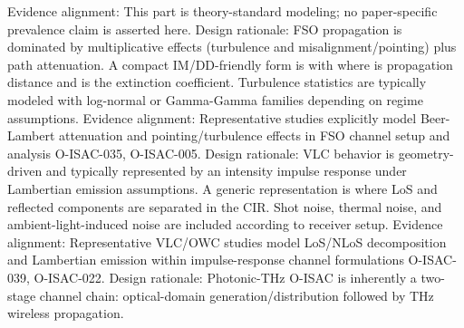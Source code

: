 {}Evidence alignment: This part is theory-standard modeling; no paper-specific prevalence claim is asserted here.\markdownRendererInterblockSeparator
{}
\markdownRendererSectionEnd \markdownRendererSectionBegin
{}\markdownRendererInterblockSeparator
{}Design rationale: FSO propagation is dominated by multiplicative effects (turbulence and misalignment/pointing) plus path attenuation.\markdownRendererParagraphSeparator
{}A compact IM/DD-friendly form is\markdownRendererSoftLineBreak
{}\markdownRendererSoftLineBreak
{}with\markdownRendererSoftLineBreak
{}\markdownRendererSoftLineBreak
{}where  is propagation distance and \markdownRendererInlineMath{\kappa} is the extinction coefficient. Turbulence statistics are typically modeled with log-normal or Gamma-Gamma families depending on regime assumptions.\markdownRendererParagraphSeparator
{}Evidence alignment: Representative studies explicitly model Beer-Lambert attenuation and pointing/turbulence effects in FSO channel setup and analysis O-ISAC-035, O-ISAC-005.\markdownRendererInterblockSeparator
{}
\markdownRendererSectionEnd \markdownRendererSectionBegin
{}\markdownRendererInterblockSeparator
{}Design rationale: VLC behavior is geometry-driven and typically represented by an intensity impulse response under Lambertian emission assumptions.\markdownRendererParagraphSeparator
{}A generic representation is\markdownRendererSoftLineBreak
{}\markdownRendererSoftLineBreak
{}where LoS and reflected components are separated in the CIR. Shot noise, thermal noise, and ambient-light-induced noise are included according to receiver setup.\markdownRendererParagraphSeparator
{}Evidence alignment: Representative VLC/OWC studies model LoS/NLoS decomposition and Lambertian emission within impulse-response channel formulations O-ISAC-039, O-ISAC-022.\markdownRendererInterblockSeparator
{}
\markdownRendererSectionEnd \markdownRendererSectionBegin
{}\markdownRendererInterblockSeparator
{}Design rationale: Photonic-THz O-ISAC is inherently a two-stage channel chain: optical-domain generation/distribution followed by THz wireless propagation.\markdownRendererParagraphSeparator
